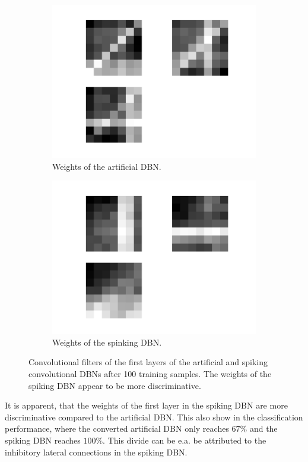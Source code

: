  \begin{figure}[h!]
	\centering
	\begin{subfigure}[t]{.45\textwidth}
  		\centering
  		\includegraphics[width=.9\linewidth]{imgs/vs/w_rbm.png}
  		\caption{Weights of the artificial DBN.}
  		\label{fig:sub1}
	\end{subfigure}%
	\begin{subfigure}[t]{.45\textwidth}
  		\centering
  		\includegraphics[width=.9\linewidth]{imgs/vs/w_spike.png}
  		\caption{Weights of the spinking DBN.}
  		\label{fig:sub2}
	\end{subfigure}
	\caption{Convolutional filters of the first layers of the artificial and spiking convolutional DBNs after 100 training samples. The weights of the spiking DBN appear to be more discriminative.}
	\label{fig:convvsnoconv}
\end{figure}

It is apparent, that the weights of the first layer in the spiking DBN are more discriminative compared to the artificial DBN.
This also show in the classification performance, where the converted artificial DBN only reaches $67 \%$ and the spiking DBN reaches $100 \%$.
This divide can be e.a. be attributed to the inhibitory lateral connections in the spiking DBN.  
